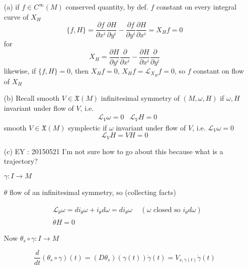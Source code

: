 \begin{enumerate}
\item[(a)] if $f\in C^{\infty}(M)$ conserved quantity, by def. $f$ constant on every integral curve of $X_H$
\[
\lbrace f,H\rbrace = \frac{ \partial f}{ \partial x^i} \frac{ \partial H}{ \partial y^i} - \frac{ \partial f}{ \partial y^i} \frac{ \partial H}{ \partial x^i} = X_H f = 0 
\]
for 
\[
X_H = \frac{ \partial H}{ \partial y^i} \frac{ \partial }{ \partial x^i} - \frac{ \partial H}{ \partial x^i} \frac{ \partial }{ \partial y^i} 
\] 
likewise, if $\lbrace f,H \rbrace =0$, then $X_Hf =0$, $X_Hf = \mathcal{L}_{X_H} f= 0 $, so $f$ constant on flow of $X_H$
\item[(b)] Recall smooth $V \in \mathfrak{X}(M)$ infinitesimal symmetry of $(M,\omega,H)$ if $\omega, H$ invariant under flow of $V$, i.e. 
\[
\begin{aligned}
  & \mathcal{L}_V \omega =0 
  &  \mathcal{L}_VH = 0 
\end{aligned}
\]
smooth $V\in \mathfrak{X}(M)$ symplectic if $\omega$ invariant under flow of $V$, i.e. $\mathcal{L}_V\omega =0$
\[
\mathcal{L}_VH = VH = 0
\]
\item[(c)] EY : 20150521 I'm not sure how to go about this because what is a trajectory?

$\gamma: I \to M$

$\theta$ flow of an infinitesimal symmetry, so (collecting facts)

\[
\begin{aligned}
  & \mathcal{L}_{\dot{\theta}}\omega = di_{\dot{\theta}}\omega + i_{\dot{\theta}}d\omega = di_{\dot{\theta}}\omega \quad \, (\omega \text{ closed so } i_{\dot{\theta}}d\omega) \\ 
  & \dot{\theta}H = 0 
\end{aligned}
\]

Now $\theta_s \circ \gamma : I \to M$

\[
\frac{d}{dt}(\theta_s \circ \gamma)(t) = (D\theta_s)(\gamma(t)) \dot{\gamma}(t) = V_{s,\gamma(t)} \dot{\gamma}(t)
\]
\end{enumerate}




